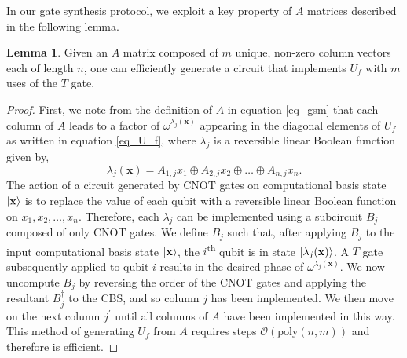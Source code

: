 \documentclass[notitlepage]{article}
\theoremstyle{definition}
\theoremstyle{problem}
\theoremstyle{lemma}
\newtheorem{lemma}{Lemma}[section]
\begin{document}
In our gate synthesis protocol, we exploit a key property of $A$ matrices described in the following lemma.
\begin{lemma}
	Given an $A$ matrix composed of $m$ unique, non-zero column vectors each of length $n$, one can efficiently generate a circuit that implements $U_f$ with $m$ uses of the $T$ gate.
\end{lemma}
\begin{proof}
	First, we note from the definition of $A$ in equation \ref{eq_gsm} that each column of $A$ leads to a factor of $\omega^{\lambda_j(\mathbf{x})}$ appearing in the diagonal elements of $U_f$ as written in equation \ref{eq_U_f}, where $\lambda_j$ is a reversible linear Boolean function given by,
	\begin{equation}
	\lambda_j(\mathbf{x}) = A_{1,j}x_1 \oplus A_{2,j}x_2 \oplus \dots \oplus A_{n,j}x_n.
	\end{equation}
	The action of a circuit generated by CNOT gates on computational basis state $\left\vert{\mathbf{x}}\right\rangle$ is to replace the value of each qubit with a reversible linear Boolean function on $x_1, x_2, \dots, x_n$. Therefore, each $\lambda_j$ can be implemented using a subcircuit $B_j$ composed of only CNOT gates. We define $B_j$ such that, after applying $B_j$ to the input computational basis state $\left\vert{\mathbf{x}}\right\rangle$, the $i$\textsuperscript{th} qubit is in state $\left\vert{\lambda_j(\mathbf{x})}\right\rangle$. A $T$ gate subsequently applied to qubit $i$ results in the desired phase of $\omega^{\lambda_j(\mathbf{x})}$. We now uncompute $B_j$ by reversing the order of the CNOT gates and applying the resultant $B_j^\dagger$ to the CBS, and so column $j$ has been implemented. We then move on the next column $j^\prime$ until all columns of $A$ have been implemented in this way. This method of generating $U_f$ from $A$ requires steps $\mathcal{O}(\textrm{poly}(n,m))$ and therefore is efficient.
\end{proof}

\end{document}
